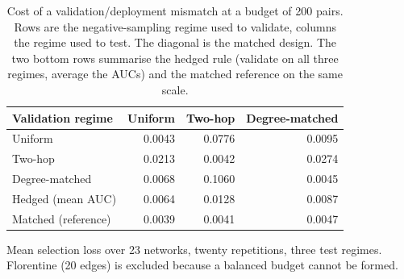 \begin{table}[htbp]
\centering
\scriptsize
\setlength{\tabcolsep}{4pt}
\caption{Cost of a validation/deployment mismatch at a budget of 200 pairs. Rows are the negative-sampling regime used to validate, columns the regime used to test. The diagonal is the matched design. The two bottom rows summarise the hedged rule (validate on all three regimes, average the AUCs) and the matched reference on the same scale.}
\label{tab:shift}
\begin{tabular}{l r r r}
\toprule
Validation regime & Uniform & Two-hop & Degree-matched \\
\midrule
Uniform & 0.0043 & 0.0776 & 0.0095 \\
Two-hop & 0.0213 & 0.0042 & 0.0274 \\
Degree-matched & 0.0068 & 0.1060 & 0.0045 \\
\midrule
Hedged (mean AUC) & 0.0064 & 0.0128 & 0.0087 \\
Matched (reference) & 0.0039 & 0.0041 & 0.0047 \\
\bottomrule
\end{tabular}
\par\vspace{2pt}\begin{minipage}{\linewidth}\footnotesize Mean selection loss over 23 networks, twenty repetitions, three test regimes. Florentine (20 edges) is excluded because a balanced budget cannot be formed.\end{minipage}
\end{table}
